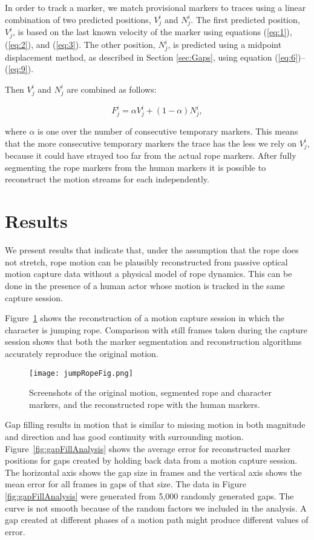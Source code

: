 In order to track a marker, we match provisional markers to traces using a linear combination of two predicted positions, $V_j^i$ and $N_j^i$. The first predicted position, $V_j^i$, is based on the last known velocity of the marker using equations (\ref{eq:1}), (\ref{eq:2}), and (\ref{eq:3}). The other position, $N_j^i$, is predicted using a midpoint displacement method, as described in Section \ref{sec:Gaps}, using equation (\ref{eq:6})--(\ref{eq:9}).

Then $V_j^i$ and $N_j^i$ are combined as follows:

\begin{equation}
F_j^i= \alpha V_j^i + (1 - \alpha) N_j^i,
\end{equation}

where $\alpha$ is one over the number of consecutive temporary markers. This means that the more consecutive temporary markers the trace has the less we rely on $V_j^i$, because it could have strayed too far from the actual rope markers. After fully segmenting the rope markers from the human markers it is possible to reconstruct the motion streams for each independently.

\section{Results} 

We present results that indicate that, under the assumption that the rope does not stretch, rope motion can be plausibly reconstructed from passive optical motion capture data without a physical model of rope dynamics.  This can be done in the presence of a human actor whose motion is tracked in the same capture session.  

Figure~\ref{fig:jumpRopeResult} shows the reconstruction of a motion capture session in which the character is jumping rope. Comparison with still frames taken during the capture session shows that both the marker segmentation and reconstruction algorithms accurately reproduce the original motion.

\begin{figure}[tb]
\texttt{[image: jumpRopeFig.png]}
\caption[Screenshots of original and reconstructed rope and human actor.]{Screenshots of the original motion, segmented rope and character markers, and the reconstructed rope with the human markers.}
\label{fig:jumpRopeResult} 
\end{figure}

Gap filling results in motion that is similar to missing motion in both magnitude and direction and has good continuity with surrounding motion.  Figure~\ref{fig:gapFillAnalysis} shows the average error for reconstructed marker positions for gaps created by holding back data from a motion capture session.  The horizontal axis shows the gap size in frames and the vertical axis shows the mean error for all frames in gaps of that size.  The data in Figure \ref{fig:gapFillAnalysis} were generated from 5,000 randomly generated gaps.  The curve is not smooth because of the random factors we included in the analysis. A gap created at different phases of a motion path might produce different values of error.

